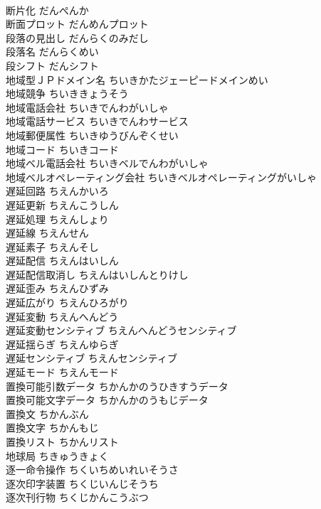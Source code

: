 \documentclass[8pt]{extreport}
\begin{document}
\begin{CJK}{UTF8}{min}
\\	断片化	だんぺんか	
\\	断面プロット	だんめんプロット	
\\	段落の見出し	だんらくのみだし	
\\	段落名	だんらくめい	
\\	段シフト	だんシフト	
\\	地域型ＪＰドメイン名	ちいきかたジェーピードメインめい	
\\	地域競争	ちいききょうそう	
\\	地域電話会社	ちいきでんわがいしゃ	
\\	地域電話サービス	ちいきでんわサービス	
\\	地域郵便属性	ちいきゆうびんぞくせい	
\\	地域コード	ちいきコード	
\\	地域ベル電話会社	ちいきベルでんわがいしゃ	
\\	地域ベルオペレーティング会社	ちいきベルオペレーティングがいしゃ	
\\	遅延回路	ちえんかいろ	
\\	遅延更新	ちえんこうしん	
\\	遅延処理	ちえんしょり	
\\	遅延線	ちえんせん	
\\	遅延素子	ちえんそし	
\\	遅延配信	ちえんはいしん	
\\	遅延配信取消し	ちえんはいしんとりけし	
\\	遅延歪み	ちえんひずみ	
\\	遅延広がり	ちえんひろがり	
\\	遅延変動	ちえんへんどう	
\\	遅延変動センシティブ	ちえんへんどうセンシティブ	
\\	遅延揺らぎ	ちえんゆらぎ	
\\	遅延センシティブ	ちえんセンシティブ	
\\	遅延モード	ちえんモード	
\\	置換可能引数データ	ちかんかのうひきすうデータ	
\\	置換可能文字データ	ちかんかのうもじデータ	
\\	置換文	ちかんぶん	
\\	置換文字	ちかんもじ	
\\	置換リスト	ちかんリスト	
\\	地球局	ちきゅうきょく	
\\	逐一命令操作	ちくいちめいれいそうさ	
\\	逐次印字装置	ちくじいんじそうち	
\\	逐次刊行物	ちくじかんこうぶつ	

\end{CJK}
\end{document}
